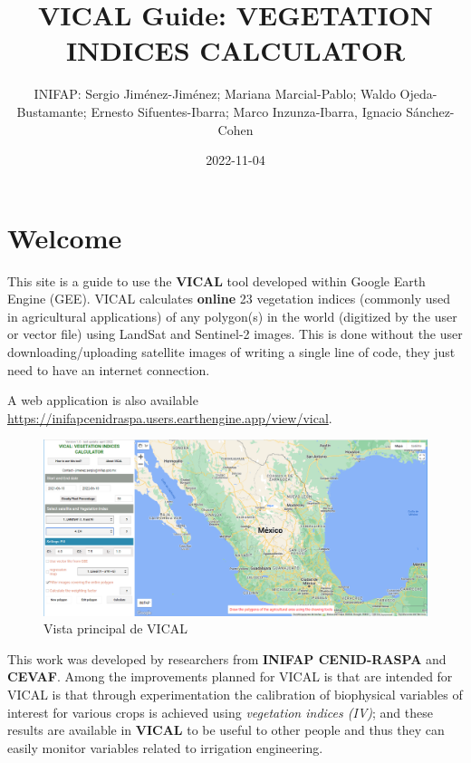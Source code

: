\documentclass[
]{book}
\title{VICAL Guide: VEGETATION INDICES CALCULATOR}
\author{INIFAP: Sergio Jiménez-Jiménez; Mariana Marcial-Pablo; Waldo Ojeda-Bustamante; Ernesto Sifuentes-Ibarra; Marco Inzunza-Ibarra, Ignacio Sánchez-Cohen}
\date{2022-11-04}
\begin{document}
\maketitle

{
\setcounter{tocdepth}{1}
\tableofcontents
}
\hypertarget{welcome}{%
\chapter*{Welcome}\label{welcome}}

This site is a guide to use the \textbf{VICAL} tool developed within Google Earth Engine (GEE). VICAL calculates \textbf{online} 23 vegetation indices (commonly used in agricultural applications) of any polygon(s) in the world (digitized by the user or vector file) using LandSat and Sentinel-2 images. This is done without the user downloading/uploading satellite images of writing a single line of code, they just need to have an internet connection.

A web application is also available \url{https://inifapcenidraspa.users.earthengine.app/view/vical}.

\begin{figure}

{\centering \includegraphics[width=0.9\linewidth]{./images/Captura2} 

}

\caption{Vista principal de VICAL}\label{fig:fig2}
\end{figure}

This work was developed by researchers from \textbf{INIFAP CENID-RASPA} and \textbf{CEVAF}. Among the improvements planned for VICAL is that are intended for VICAL is that through experimentation the calibration of biophysical variables of interest for various crops is achieved using \emph{vegetation indices (IV)}; and these results are available in \textbf{VICAL} to be useful to other people and thus they can easily monitor variables related to irrigation engineering.
\end{document}

